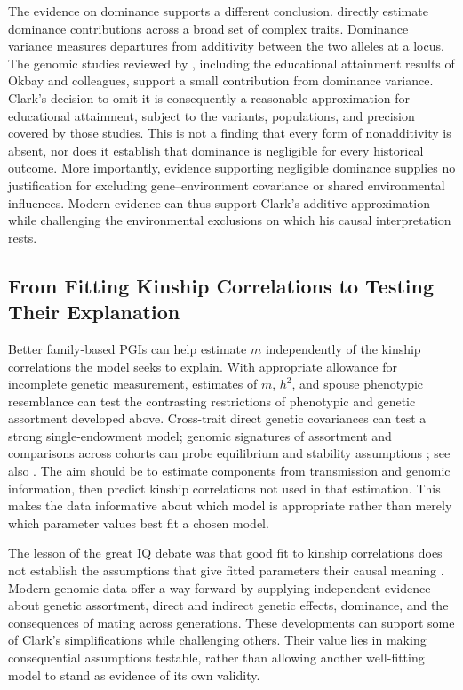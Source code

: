 The evidence on dominance supports a different conclusion. \citet{PazokitoroudiEtAl2021} directly estimate dominance contributions across a broad set of complex traits. Dominance
variance measures departures from additivity between the two alleles at
a locus. The genomic studies reviewed by
\citet[Sections~3.2 and~4.7]{BenjaminEtAl2026}, %
including the educational
attainment results of Okbay and colleagues, support a small contribution
from dominance variance. Clark's decision to omit it is consequently a
reasonable approximation for educational attainment, subject to the
variants, populations, and precision covered by those studies. This is
not a finding that every form of nonadditivity is absent, nor does it
establish that dominance is negligible for every historical outcome.
More importantly, evidence supporting negligible dominance supplies no
justification for excluding gene--environment covariance or shared
environmental influences. Modern evidence can thus support Clark's
additive approximation while challenging the environmental exclusions
on which his causal interpretation rests.

\subsection{From Fitting Kinship Correlations to Testing Their Explanation}

Better family-based PGIs can help estimate $m$ independently of the
kinship correlations the model seeks to explain. With appropriate allowance
for incomplete genetic measurement, estimates of $m$, $h^2$, and spouse
phenotypic resemblance can test the contrasting restrictions of phenotypic
and genetic assortment developed above. Cross-trait direct genetic
covariances can test a strong single-endowment model; genomic signatures
of assortment and comparisons across cohorts can probe equilibrium and
stability assumptions \citep{YengoEtAl2018}; see also \citet[Sections~4.7 and~6.4]{BenjaminEtAl2026}.
The aim should be to estimate components from transmission and genomic
information, then predict kinship correlations not used in that estimation.
This makes the data informative about which model is appropriate rather
than merely which parameter values best fit a chosen model.

The lesson of the great IQ debate was that good fit to kinship correlations
does not establish the assumptions that give fitted parameters their causal
meaning \citep{Loehlin1978,Goldberger1978}. Modern genomic data offer a way
forward by supplying independent evidence about genetic assortment, direct
and indirect genetic effects, dominance, and the consequences of mating
across generations. These developments can support some of Clark's
simplifications while challenging others. Their value lies in making
consequential assumptions testable, rather than allowing another
well-fitting model to stand as evidence of its own validity.
